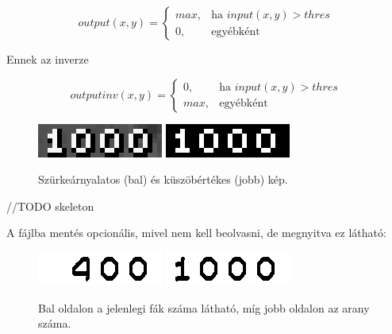 
\begin{equation*}
    output(x,y) = \left\{ 
    \begin{matrix}
        max, & \text{ha } input(x,y) > thres \\
        0, & \text{egyébként}
    \end{matrix} \right.
\end{equation*}

Ennek az inverze

\begin{equation*}
    outputinv(x,y) = \left\{ 
    \begin{matrix}
        0, & \text{ha } input(x,y) > thres \\
        max, & \text{egyébként}
    \end{matrix} \right.
\end{equation*}

\begin{figure}[h]
    \centering
    \includegraphics[scale=1]{images/grey.png}
    \includegraphics[scale=1]{images/thres.png}
    \caption{Szürkeárnyalatos (bal) és küszöbértékes (jobb) kép.}
    \label{fig:numbers}
\end{figure}

//TODO skeleton

A fájlba mentés opcionális, mivel nem kell beolvasni, de megnyitva ez látható: 

\begin{figure}[h]
    \centering
    \includegraphics[scale=1]{images/Lumber.png}
    \includegraphics[scale=1]{images/Gold.png}
    \caption{Bal oldalon a jelenlegi fák száma látható, míg jobb oldalon az arany száma. }
    \label{fig:numbers}
\end{figure}

